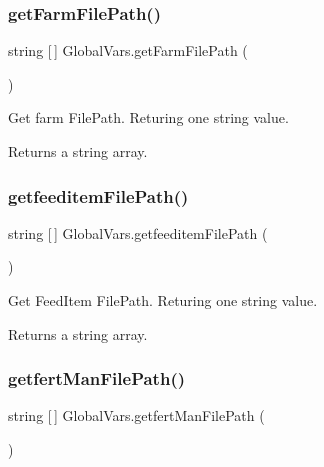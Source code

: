 \subsubsection{\texorpdfstring{getFarmFilePath()}{getFarmFilePath()}}
{\footnotesize\ttfamily string \mbox{[}$\,$\mbox{]} Global\+Vars.\+get\+Farm\+File\+Path (\begin{DoxyParamCaption}{ }\end{DoxyParamCaption})\hspace{0.3cm}{\ttfamily [inline]}}



Get farm File\+Path. Returing one string value. 

\begin{DoxyReturn}{Returns}
a string array. 
\end{DoxyReturn}
\mbox{\label{class_global_vars_a3e9bd776f13ec83a538a37aa89438499}} 
\subsubsection{\texorpdfstring{getfeeditemFilePath()}{getfeeditemFilePath()}}
{\footnotesize\ttfamily string \mbox{[}$\,$\mbox{]} Global\+Vars.\+getfeeditem\+File\+Path (\begin{DoxyParamCaption}{ }\end{DoxyParamCaption})\hspace{0.3cm}{\ttfamily [inline]}}



Get Feed\+Item File\+Path. Returing one string value. 

\begin{DoxyReturn}{Returns}
a string array. 
\end{DoxyReturn}
\mbox{\label{class_global_vars_a42b557435cac90388444da5e97b5f7a7}} 
\subsubsection{\texorpdfstring{getfertManFilePath()}{getfertManFilePath()}}
{\footnotesize\ttfamily string \mbox{[}$\,$\mbox{]} Global\+Vars.\+getfert\+Man\+File\+Path (\begin{DoxyParamCaption}{ }\end{DoxyParamCaption})\hspace{0.3cm}{\ttfamily [inline]}}



